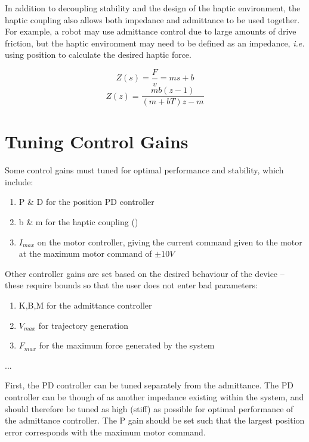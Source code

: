 \documentclass[12pt]{report}
\begin{document}
	In addition to decoupling stability and the design of the haptic environment, the haptic coupling also allows both impedance and admittance to be used together. For example, a robot may use admittance control due to large amounts of drive friction, but the haptic environment may need to be defined as an impedance, \textit{i.e.} using position to calculate the desired haptic force. 
	
	\begin{equation}
		Z(s) = \frac{F}{v} = ms + b  
	\end{equation}
	\begin{equation}
		Z(z) = \frac{mb(z-1)}{(m+bT)z - m}
	\end{equation}
	
	
	\section{Tuning Control Gains}

	Some control gains must tuned for optimal performance and stability, which include:
	
	\begin{enumerate}
		\item P \& D for the position PD controller 
		\item b \& m for the haptic coupling ()
		\item $I_{max}$ on the motor controller, giving the current command given to the motor at the maximum motor command of $\pm 10V$
	\end{enumerate}		
	
	Other controller gains are set based on the desired behaviour of the device -- these require bounds so that the user does not enter bad parameters:
	
	\begin{enumerate}
		\item K,B,M for the admittance controller
		\item $V_{max}$ for trajectory generation
		\item $F_{max}$ for the maximum force generated by the system
	\end{enumerate}
	
	...
	
	First, the PD controller can be tuned separately from the admittance. The PD controller can be though of as another impedance existing within the system, and should therefore be tuned as high (stiff) as possible for optimal performance of the admittance controller. The P gain should be set such that the largest position error corresponds with the maximum motor command.
	
\end{document}

